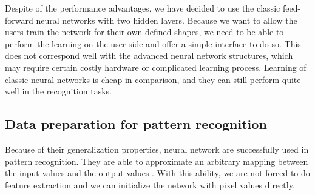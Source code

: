 Despite of the performance advantages, we have decided to use the classic feed-forward neural networks with two hidden layers. Because we want to allow the users train the network for their own defined shapes, we need to be able to perform the learning on the user side and offer a simple interface to do so.
This does not correspond well with the advanced neural network structures, which may require certain costly hardware or complicated learning process. Learning of classic neural networks is cheap in comparison, and they can still perform quite well in the recognition tasks.

\subsection{Data preparation for pattern recognition}
Because of their generalization properties, neural network are successfully used in pattern recognition. They are able to approximate an arbitrary mapping between the input values and the output values \cite{bishop}. With this ability, we are not forced to do feature extraction and we can initialize the network with pixel values directly.

